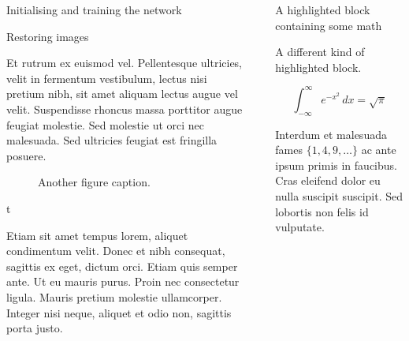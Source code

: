 \documentclass[final]{beamer}
\newlength{\sepwidth}
\newlength{\colwidth}
\newcommand{\separatorcolumn}{\begin{column}{\sepwidth}\end{column}}
\begin{document}
\begin{frame}[t]
\begin{columns}[t]
\begin{column}{\colwidth}
\begin{block}{Initialising and training the network}
  \end{block}

  \begin{block}{Restoring images}

    Et rutrum ex euismod vel. Pellentesque ultricies, velit in fermentum
    vestibulum, lectus nisi pretium nibh, sit amet aliquam lectus augue vel
    velit. Suspendisse rhoncus massa porttitor augue feugiat molestie. Sed
    molestie ut orci nec malesuada. Sed ultricies feugiat est fringilla
    posuere.

    \begin{figure}
      \centering
      \caption{Another figure caption.}
    \end{figure}

  \end{block}

  \begin{block}{t}

    Etiam sit amet tempus lorem, aliquet condimentum velit. Donec et nibh
    consequat, sagittis ex eget, dictum orci. Etiam quis semper ante. Ut eu
    mauris purus. Proin nec consectetur ligula. Mauris pretium molestie
    ullamcorper. Integer nisi neque, aliquet et odio non, sagittis porta justo.

  \end{block}

\end{column}

\separatorcolumn

\begin{column}{\colwidth}

  \begin{exampleblock}{A highlighted block containing some math}

    A different kind of highlighted block.

    $$
    \int_{-\infty}^{\infty} e^{-x^2}\,dx = \sqrt{\pi}
    $$

    Interdum et malesuada fames $\{1, 4, 9, \ldots\}$ ac ante ipsum primis in
    faucibus. Cras eleifend dolor eu nulla suscipit suscipit. Sed lobortis non
    felis id vulputate.


\end{exampleblock}
\end{column}
\end{columns}
\end{frame}
\end{document}
